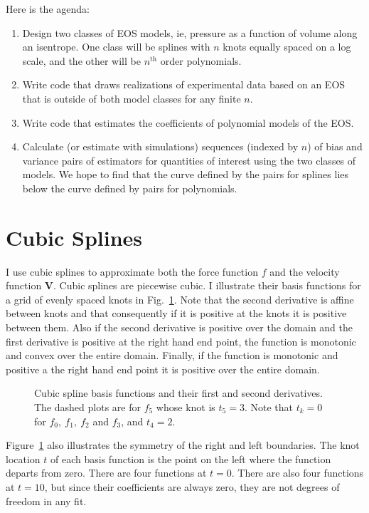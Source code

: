 \documentclass[11pt]{article}
\newcommand\Vt{\mathbf{V}}
\begin{document}
Here is the agenda:
\begin{enumerate}
\item Design two classes of EOS models, ie, pressure as a function of
  volume along an isentrope.  One class will be splines with $n$ knots
  equally spaced on a log scale, and the other will be $n^{\text{th}}$
  order polynomials.
\item Write code that draws realizations of experimental data based on
  an EOS that is outside of both model classes for any finite $n$.
\item Write code that estimates the coefficients of polynomial models
  of the EOS.
\item Calculate (or estimate with simulations) sequences (indexed by
  $n$) of bias and variance pairs of estimators for quantities of
  interest using the two classes of models.  We hope to find that the
  curve defined by the pairs for splines lies below the curve defined
  by pairs for polynomials.
\end{enumerate}

\appendix

\section{Cubic Splines}
\label{sec:splines}

I use cubic splines to approximate both the force function $f$ and the
velocity function $\Vt$.  Cubic splines are piecewise cubic.  I
illustrate their basis functions for a grid of evenly spaced knots in
Fig.~\ref{fig:basis}.  Note that the second derivative is affine
between knots and that consequently if it is positive at the knots it
is positive between them.  Also if the second derivative is positive
over the domain and the first derivative is positive at the right hand
end point, the function is monotonic and convex over the entire
domain.  Finally, if the function is monotonic and positive a the
right hand end point it is positive over the entire domain.
\begin{figure}
  \centering
    \caption{Cubic spline basis functions and their first and second
      derivatives. The dashed plots are for $f_5$ whose knot is
      $t_5=3$.  Note that $t_k=0$ for $f_0,~f_1,~f_2$ and $f_3$, and
      $t_4=2$.}
  \label{fig:basis}
\end{figure}

Figure~\ref{fig:basis} also illustrates the symmetry of the right and
left boundaries.  The knot location $t$ of each basis function is the
point on the left where the function departs from zero.  There are
four functions at $t=0$.  There are also four functions at $t=10$, but
since their coefficients are always zero, they are not degrees of
freedom in any fit.
\end{document}
